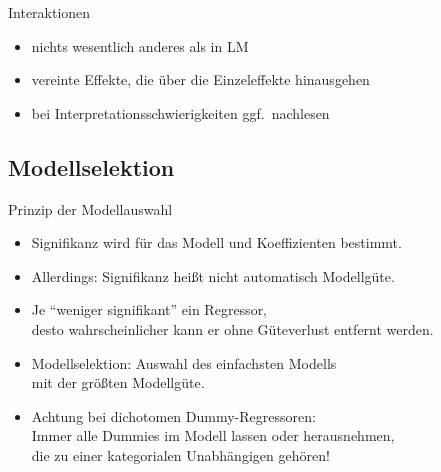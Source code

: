 \begin{frame}
  {Interaktionen}
  \begin{itemize}[<+->]
    \item nichts wesentlich anderes als in LM
    \item vereinte Effekte, die über die Einzeleffekte hinausgehen
    \item bei Interpretationsschwierigkeiten ggf.\ nachlesen
  \end{itemize}
\end{frame}

\subsection{Modellselektion}

\begin{frame}
  {Prinzip der Modellauswahl}
  \begin{itemize}[<+->]
    \item Signifikanz wird für das Modell und Koeffizienten bestimmt.
    \item Allerdings: Signifikanz heißt nicht automatisch Modellgüte.
    \item Je "`weniger signifikant"' ein Regressor,\\
      desto wahrscheinlicher kann er ohne Güteverlust entfernt werden.
    \item Modellselektion: Auswahl des \alert{einfachsten Modells}\\
      mit der \alert{größten Modellgüte}.
    \vspace{0.5cm}
    \item Achtung bei dichotomen Dummy-Regressoren:\\
      Immer \alert{alle} Dummies im Modell lassen oder herausnehmen,\\
      die zu einer kategorialen Unabhängigen gehören!
  \end{itemize}
\end{frame}

